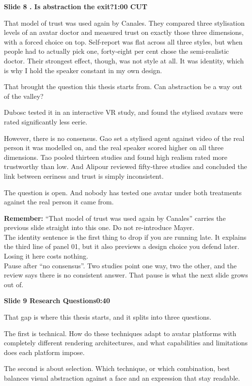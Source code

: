 \documentclass[11pt,a4paper]{article}
\newcommand{\slidehead}[3]{%
  \needspace{5\baselineskip}
  \vspace{0.9em}
  \noindent\colorbox{knblue}{\parbox{0.978\textwidth}{\vspace{1pt}\color{white}\textbf{Slide #1 \quad #2}\hfill\textbf{#3}\vspace{1pt}}}
  \vspace{0.35em}\par}
\newcommand{\remind}[1]{%
  \vspace{0.15em}
  \noindent\colorbox{knlight}{\parbox{0.972\textwidth}{\small\color{knblue}\textbf{Remember:} #1}}
  \vspace{0.2em}\par}
\begin{document}
\slidehead{8}{3. Is abstraction the exit?}{1:00 \quad CUT}

That model of trust was used again by Canales. They compared three stylisation levels of an avatar doctor and measured trust on exactly those three dimensions, with a forced choice on top. Self-report was flat across all three styles, but when people had to actually pick one, forty-eight per cent chose the semi-realistic doctor. Their strongest effect, though, was not style at all. It was identity, which is why I hold the speaker constant in my own design.

That brought the question this thesis starts from. Can abstraction be a way out of the valley?

Dubosc tested it in an interactive VR study, and found the stylised avatars were rated significantly less eerie.

However, there is no consensus. Gao set a stylised agent against video of the real person it was modelled on, and the real speaker scored higher on all three dimensions. Tao pooled thirteen studies and found high realism rated more trustworthy than low. And Alipour reviewed fifty-three studies and concluded the link between eeriness and trust is simply inconsistent.

The question is open. And nobody has tested one avatar under both treatments against the real person it came from.

\remind{``That model of trust was used again by Canales'' carries the previous slide straight into this one. Do not re-introduce Mayer.\\[0.4em] The identity sentence is the first thing to drop if you are running late. It explains the third line of panel 01, but it also previews a design choice you defend later. Losing it here costs nothing.\\[0.4em] Pause after ``no consensus''. Two studies point one way, two the other, and the review says there is no consistent answer. That pause is what the next slide grows out of.}

\slidehead{9}{Research Questions}{0:40}

That gap is where this thesis starts, and it splits into three questions.

The first is technical. How do these techniques adapt to avatar platforms with completely different rendering architectures, and what capabilities and limitations does each platform impose.

The second is about selection. Which technique, or which combination, best balances visual abstraction against a face and an expression that stay readable.
\end{document}
